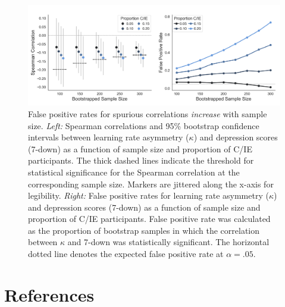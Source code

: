 \documentclass[a4paper,notitlepage,12pt]{article}
\begin{document}
\begin{refsection}[main]
\clearpage
\begin{figure}[h]
    \includegraphics[width=16cm]{../figures/main_03b.png}
    \centering
    \captionsetup{width=0.88\textwidth}
    \caption{False positive rates for spurious correlations \emph{increase} with sample size. \textit{Left:} Spearman correlations and 95\% bootstrap confidence intervals between learning rate asymmetry ($\kappa$) and depression scores (7-down) as a function of sample size and proportion of C/IE participants. The thick dashed lines indicate the threshold for statistical significance for the Spearman correlation at the corresponding sample size. Markers are jittered along the x-axis for legibility. \textit{Right:} False positive rates for learning rate asymmetry ($\kappa$) and depression scores (7-down) as a function of sample size and proportion of C/IE participants. False positive rate was calculated as the proportion of bootstrap samples in which the correlation between $\kappa$ and 7-down was statistically significant. The horizontal dotted line denotes the expected false positive rate at $\alpha = .05$.}
    \label{fig:bootstrap}
\end{figure}

\clearpage
\section*{References}

\printbibliography[heading=main]
\end{refsection}
\end{document}
